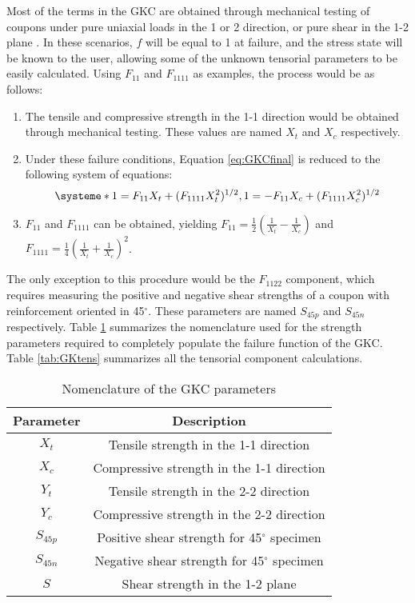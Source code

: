 \documentclass[main.tex]{subfiles}
\begin{document}
Most of the terms in the GKC are obtained through mechanical testing of coupons under pure uniaxial loads in the 1 or 2 direction, or pure shear in the 1-2 plane \cite{Osswald2017a}. In these scenarios, $f$ will be equal to 1 at failure, and the stress state will be known to the user, allowing some of the unknown tensorial parameters to be easily calculated. Using $F_{11}$ and $F_{1111}$ as examples, the process would be as follows:
\pagebreak
\begin{enumerate}
	\item The tensile and compressive strength in the 1-1 direction would be obtained through mechanical testing. These values are named $X_t$ and $X_c$ respectively.
	\item Under these failure conditions, Equation \ref{eq:GKCfinal} is reduced to the following system of equations:
	\[
	\systeme*{1=F_{11}X_t + (F_{1111}X_t^{2})^{1/2}, 1= -F_{11}X_c + (F_{1111}X_c^{2})^{1/2}}
	\]

	\item $F_{11}$ and $F_{1111}$ can be obtained, yielding $F_{11}=\frac{1}{2}(\frac{1}{X_t}-\frac{1}{X_c})$ and $F_{1111}=\frac{1}{4}(\frac{1}{X_t}+\frac{1}{X_c})^2$.
\end{enumerate}

The only exception to this procedure would be the $F_{1122}$ component, which requires measuring the positive and negative shear strengths of a coupon with reinforcement oriented in 45$^\circ$. These parameters are named $S_{45p}$ and $S_{45n}$ respectively. Table \ref{tab:GKparam} summarizes the nomenclature used for the strength parameters required to completely populate the failure function of the GKC. Table \ref{tab:GKtens} summarizes all the tensorial component calculations.

\begin{table} [h]
	\centering
	\caption{Nomenclature of the GKC parameters}
	\begin{tabular}{ c c }
	\toprule
		\textbf{Parameter} & \textbf{Description} \\ 
		\midrule
		$X_t$ & Tensile strength in the 1-1 direction\\
		$X_c$ & Compressive strength in the 1-1 direction\\
		$Y_t$ & Tensile strength in the 2-2 direction\\
		$Y_c$ & Compressive strength in the 2-2 direction\\
		$S_{45p}$ & Positive shear strength for 45$^\circ$ specimen\\
		$S_{45n}$ & Negative shear strength for 45$^\circ$ specimen\\
		$S$ & Shear strength in the 1-2 plane\\
	\bottomrule
	\end{tabular}
	\label{tab:GKparam}
\end{table}
\end{document}
